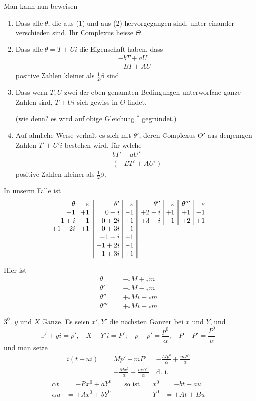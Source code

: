 Man kann nun beweisen
\begin{enumerate}\renewcommand{\labelenumi}{\arabic{enumi})}
\item Dass alle $\theta$, die aus (1) und aus (2) hervorgegangen sind, unter einander verschieden sind. Ihr Complexus heisse $\Theta$.
\item Dass alle $\theta=T+Ui$ die Eigenschaft haben, dass
\[
\begin{gathered}
-bT+aU\\
-BT+AU
\end{gathered}
\]
positive Zahlen kleiner als $\frac12\beta$ sind
\item Dass wenn $T,U$ zwei der eben genannten Bedingungen unterworfene ganze Zahlen sind, $T+Ui$ sich gewiss in $\Theta$ findet.\par
(wie denn? es wird auf obige Gleichung $^*$ gegründet.)
\item Auf ähnliche Weise verhält es sich mit $\theta'$, deren Complexus $\Theta'$ aus denjenigen Zahlen $T'+U'i$ bestehen wird, für welche
\[
\begin{gathered}
-bT'+aU'\\
-(-BT'+AU')
\end{gathered}
\]
positive Zahlen kleiner als $\frac12\beta$.
\end{enumerate}

In unserm Falle ist
\[
\setlength{\arraycolsep}{4pt}
\begin{array}{r|r||r|r||r|r||r|r}
\theta&\varepsilon&\theta'&\varepsilon&\theta''&\varepsilon&\theta'''&\varepsilon\\
+1&+1&0+i&-1&+2-i&+1&+1&-1\\
+1+i&-1&0+2i&+1&+3-i&-1&+2&+1\\
+1+2i&+1&0+3i&-1&\multicolumn{4}{c}{}\\
\multicolumn{2}{c||}{}&-1+i&+1&\multicolumn{4}{c}{}\\
\multicolumn{2}{c||}{}&-1+2i&-1&\multicolumn{4}{c}{}\\
\multicolumn{2}{c||}{}&-1+3i&+1&\multicolumn{4}{c}{}
\end{array}
\]

Hier ist
\[
\begin{aligned}
\theta&=-{}_*M+{}_*m\\
\theta'&=-{}_*M-{}_*m\\
\theta''&=+{}_*Mi+{}_*m\\
\theta'''&=+{}_*Mi-{}_*m
\end{aligned}
\]

$3^0$. $y$ und $X$ Ganze. Es seien $x',Y'$ die nächsten Ganzen bei $x$ und $Y$, und
\[
x'+yi=p',\quad X+Y'i=P';\quad p-p'=\frac{p^0}{\alpha},\quad P-P'=\frac{P^0}{\alpha}
\]
und man setze
\[
\begin{aligned}
i(t+ui)&=Mp'-mP'=-\frac{Mp^0}{\alpha}+\frac{mP^0}{\alpha}\\
&=-\frac{Mx^0}{\alpha}+\frac{miY^0}{\alpha}\quad\text{d. i.}
\end{aligned}
\]
\[
\begin{alignedat}{3}
\alpha t&=-Bx^0+aY^0\quad&\text{so ist}\quad&x^0&=-bt+au\\
\alpha u&=+Ax^0+bY^0&&Y^0&=+At+Bu
\end{alignedat}
\]

